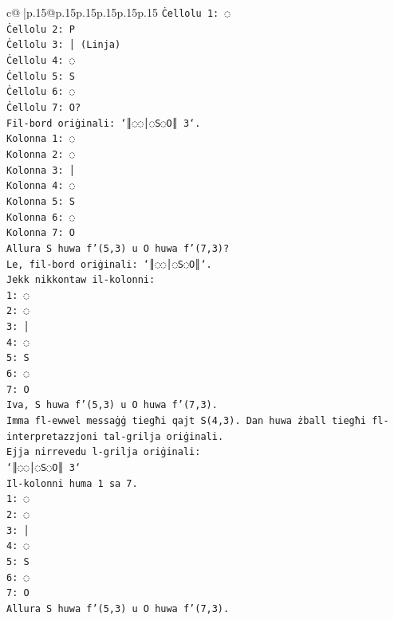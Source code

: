 \documentclass{article}
\begin{document}
{\begin{supertabular}{c@{$\;$}|p{.15\linewidth}@{}p{.15\linewidth}p{.15\linewidth}p{.15\linewidth}p{.15\linewidth}p{.15\linewidth}}
{{{\texttt{Ċellolu 1: ◌} \\
\texttt{Ċellolu 2: P} \\
\texttt{Ċellolu 3: │ (Linja)} \\
\texttt{Ċellolu 4: ◌} \\
\texttt{Ċellolu 5: S} \\
\texttt{Ċellolu 6: ◌} \\
\texttt{Ċellolu 7: O?} \\
\texttt{Fil{-}bord oriġinali: `║◌◌│◌S◌O║ 3`.} \\
\texttt{Kolonna 1: ◌} \\
\texttt{Kolonna 2: ◌} \\
\texttt{Kolonna 3: │} \\
\texttt{Kolonna 4: ◌} \\
\texttt{Kolonna 5: S} \\
\texttt{Kolonna 6: ◌} \\
\texttt{Kolonna 7: O} \\
\texttt{Allura S huwa f'(5,3) u O huwa f'(7,3)?} \\
\texttt{Le, fil{-}bord oriġinali: `║◌◌│◌S◌O║`.} \\
\texttt{Jekk nikkontaw il{-}kolonni:} \\
\texttt{1: ◌} \\
\texttt{2: ◌} \\
\texttt{3: │} \\
\texttt{4: ◌} \\
\texttt{5: S} \\
\texttt{6: ◌} \\
\texttt{7: O} \\
\texttt{Iva, S huwa f'(5,3) u O huwa f'(7,3).} \\
\texttt{Imma fl{-}ewwel messaġġ tiegħi qajt S(4,3). Dan huwa żball tiegħi fl{-}interpretazzjoni tal{-}grilja oriġinali.} \\
\texttt{Ejja nirrevedu l{-}grilja oriġinali:} \\
\texttt{`║◌◌│◌S◌O║ 3`} \\
\texttt{Il{-}kolonni huma 1 sa 7.} \\
\texttt{1: ◌} \\
\texttt{2: ◌} \\
\texttt{3: │} \\
\texttt{4: ◌} \\
\texttt{5: S} \\
\texttt{6: ◌} \\
\texttt{7: O} \\
\texttt{Allura S huwa f'(5,3) u O huwa f'(7,3).} \\
}}}
\end{supertabular}}
\end{document}
